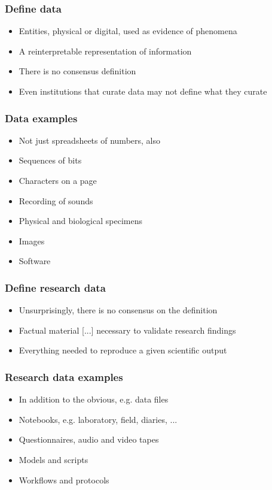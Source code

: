 \documentclass{beamer}
\begin{document}
\begin{frame}
  \frametitle{Define data}
  
  \begin{itemize}
  \item Entities, physical or digital, used as evidence of phenomena \cite{borgman15big}
  \item A reinterpretable representation of information \cite{ccsds12oais}
  \item There is no consensus definition
  \item Even institutions that curate data may not define what they curate
  \end{itemize}
\end{frame}

\begin{frame}
  \frametitle{Data examples}
  
  \begin{itemize}
  \item Not just spreadsheets of numbers, also
  \item Sequences of bits
  \item Characters on a page
  \item Recording of sounds
  \item Physical and biological specimens
  \item Images
  \item Software
  \end{itemize}
\end{frame}

\begin{frame}
  \frametitle{Define research data}
  
  \begin{itemize}
  \item Unsurprisingly, there is no consensus on the definition
  \item Factual material [...] necessary to validate research findings \cite{epsrc17researchdata}
  \item Everything needed to reproduce a given scientific output \cite{surkis15researchdata}
  \end{itemize}
\end{frame}

\begin{frame}
  \frametitle{Research data examples}
  
  \begin{itemize}
  \item In addition to the obvious, e.g. data files
  \item Notebooks, e.g. laboratory, field, diaries, ...
  \item Questionnaires, audio and video tapes
  \item Models and scripts
  \item Workflows and protocols
  \end{itemize}
\end{frame}
\end{document}

